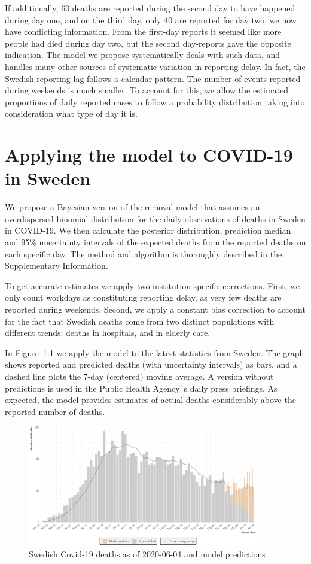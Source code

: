 \documentclass[a4paper,11pt,article,oneside,openany,american]{memoir}
\begin{document}
If additionally, 60 deaths are reported during the second day to have happened during day one, and on the third day, only 40 are reported for day two, we now have conflicting information. From the first-day reports it seemed like more people had died during day two, but the second day-reports gave the opposite indication. The model we propose systematically deals with such data, and handles many other sources of systematic variation in reporting delay. In fact, the Swedish reporting lag follows a calendar pattern. The number of events reported during weekends is much smaller. To account for this, we allow the estimated proportions of daily reported cases to follow a probability distribution taking into consideration what type of day it is.

\chapter{Applying the model to COVID-19 in Sweden}
We propose a Bayesian version of the removal model that assumes an overdispersed binomial distribution for the daily observations of deaths in Sweden in COVID-19. We then calculate the posterior distribution, prediction median and 95\% uncertainty intervals of the expected deaths from the reported deaths on each specific day. The method and algorithm is thoroughly described in the Supplementary Information.

To get accurate estimates we apply two institution-specific corrections. First, we only count workdays as constituting reporting delay, as very few deaths are reported during weekends. Second, we apply a constant bias correction to account for the fact that Swedish deaths come from two distinct populations with different trends: deaths in hospitals, and in elderly care.

In Figure~\ref{fig:latest_prediction} we apply the model to the latest statistics from Sweden. The graph shows reported and predicted deaths (with uncertainty intervals) as bars, and a dashed line plots the 7-day (centered) moving average. A version without predictions is used in the Public Health Agency´s daily press briefings. As expected, the model provides estimates of actual deaths considerably above the reported number of deaths.

\begin{figure}
    \centering
    \includegraphics[width=0.9\textwidth]{../plots/latest_prediction}
    \caption{Swedish Covid-19 deaths as of 2020-06-04 and model predictions}
    \label{fig:latest_prediction}
\end{figure}
\end{document}
